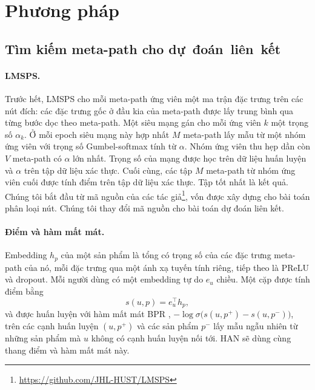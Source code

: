 \section{Phương pháp}
\label{sec:method}

\subsection{Tìm kiếm meta-path cho dự~đoán~liên~kết}
\label{sec:search}

\paragraph{LMSPS\@.} Trước hết, LMSPS \citep{li2024longrange} cho mỗi meta-path ứng
viên một ma trận đặc trưng trên các nút đích: các đặc trưng gốc ở đầu kia của meta-path được lấy
trung bình qua từng bước dọc theo meta-path. Một siêu mạng gán cho mỗi ứng viên $k$ một trọng số
$\alpha_k$. Ở mỗi epoch siêu mạng này hợp nhất $M$ meta-path lấy mẫu từ một nhóm ứng viên với trọng số
Gumbel-softmax tính từ $\alpha$. Nhóm ứng viên thu hẹp dần còn $V$ meta-path có $\alpha$ lớn
nhất. Trọng số của mạng được học trên dữ liệu huấn luyện và $\alpha$ trên tập dữ liệu xác thực. Cuối cùng, các tập $M$ meta-path từ
nhóm ứng viên cuối được tính điểm trên tập dữ liệu xác thực. Tập tốt nhất là kết quả. Chúng tôi bắt
đầu từ mã nguồn của các tác giả\footnote{\url{https://github.com/JHL-HUST/LMSPS}}, vốn được xây
dựng cho bài toán phân loại nút. Chúng tôi thay đổi mã nguồn cho bài toán dự đoán liên kết.

\paragraph{Điểm và hàm mất mát.} Embedding $h_p$ của một sản phẩm là tổng có trọng số của các đặc
trưng meta-path của nó, mỗi đặc trưng qua một ánh xạ tuyến tính riêng, tiếp theo là PReLU và
dropout. Mỗi người dùng có một embedding tự do $e_u$  chiều. Một cặp được tính điểm
bằng
\begin{equation}
  s(u, p) = e_u^{\top} h_p ,
  \label{eq:score}
\end{equation}
và được huấn luyện với hàm mất mát BPR \citep{rendle2009bpr}, $-\log \sigma\bigl(s(u, p^{+}) -
s(u, p^{-})\bigr)$, trên các cạnh huấn luyện $(u, p^{+})$ và các sản phẩm $p^{-}$ lấy mẫu ngẫu nhiên
từ những sản phẩm mà $u$ không có cạnh huấn luyện nối tới. HAN sẽ dùng cùng thang điểm và hàm mất mát này.

